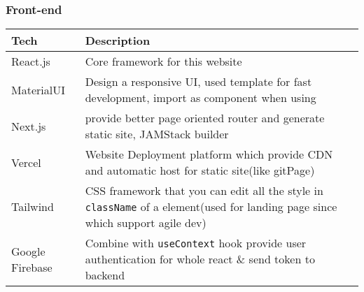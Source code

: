 \documentclass[
  paper=a4,
  ,captions=tableheading
]{scrartcl}
\begin{document}
\hypertarget{front-end}{%
\subsubsection{Front-end}\label{front-end}}

\begin{longtable}[]{@{}ll@{}}
\toprule
\begin{minipage}[b]{0.10\columnwidth}\raggedright
Tech\strut
\end{minipage} & \begin{minipage}[b]{0.84\columnwidth}\raggedright
Description\strut
\end{minipage}\tabularnewline
\midrule
\endhead
\begin{minipage}[t]{0.10\columnwidth}\raggedright
React.js\strut
\end{minipage} & \begin{minipage}[t]{0.84\columnwidth}\raggedright
Core framework for this website\strut
\end{minipage}\tabularnewline
\begin{minipage}[t]{0.10\columnwidth}\raggedright
MaterialUI\strut
\end{minipage} & \begin{minipage}[t]{0.84\columnwidth}\raggedright
Design a responsive UI, used template for fast development, import as
component when using\strut
\end{minipage}\tabularnewline
\begin{minipage}[t]{0.10\columnwidth}\raggedright
Next.js\strut
\end{minipage} & \begin{minipage}[t]{0.84\columnwidth}\raggedright
provide better page oriented router and generate static site, JAMStack
builder\strut
\end{minipage}\tabularnewline
\begin{minipage}[t]{0.10\columnwidth}\raggedright
Vercel\strut
\end{minipage} & \begin{minipage}[t]{0.84\columnwidth}\raggedright
Website Deployment platform which provide CDN and automatic host for
static site(like gitPage)\strut
\end{minipage}\tabularnewline
\begin{minipage}[t]{0.10\columnwidth}\raggedright
Tailwind\strut
\end{minipage} & \begin{minipage}[t]{0.84\columnwidth}\raggedright
CSS framework that you can edit all the style in \texttt{className} of a
element(used for landing page since which support agile dev)\strut
\end{minipage}\tabularnewline
\begin{minipage}[t]{0.10\columnwidth}\raggedright
Google Firebase\strut
\end{minipage} & \begin{minipage}[t]{0.84\columnwidth}\raggedright
Combine with \texttt{useContext} hook provide user authentication for
whole react \& send token to backend\strut
\end{minipage}\tabularnewline
\bottomrule
\end{longtable}
\end{document}
